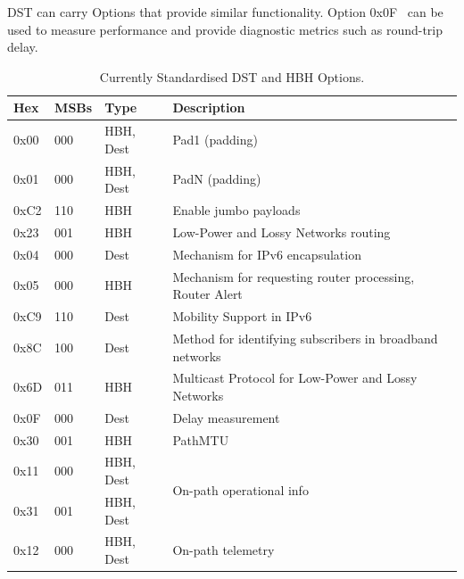 \documentclass[conference]{IEEEtran}
\begin{document}
DST can carry Options that provide similar functionality. Option 0x0F~\cite{rfc8250} can be used to measure performance and provide diagnostic metrics such as round-trip delay. 



\begin{table}[b]
\center
\caption{Currently Standardised DST and HBH Options.}
\begin{tabular}{p{}|p{}|l|p{}}
Hex  & MSBs & Type      & Description                                              \\
\hline
\hline
0x00 & 000  & HBH, Dest & Pad1 (padding)                                           \\
0x01 & 000  & HBH, Dest & PadN (padding)                                           \\
0xC2 & 110  & HBH       & Enable jumbo payloads                                    \\
0x23 & 001  & HBH       & Low-Power and Lossy Networks routing                     \\
0x04 & 000  & Dest      & Mechanism for IPv6 encapsulation                 \\
0x05 & 000  & HBH       & Mechanism for requesting router processing, Router Alert              \\
0xC9 & 110  & Dest      & Mobility Support in IPv6                                 \\
0x8C & 100  & Dest      & Method for identifying subscribers in broadband networks \\
0x6D & 011  & HBH       & Multicast Protocol for Low-Power and  Lossy Networks     \\
0x0F & 000  & Dest      & Delay measurement                                        \\
0x30 & 001  & HBH       & PathMTU                                     \\
0x11 & 000  & HBH, Dest & \multirow{2}{*}{On-path operational info}                \\
0x31 & 001  & HBH, Dest &                                                          \\
0x12 & 000  & HBH, Dest & On-path telemetry                                       
\end{tabular}
  \label{tbl:options}
\end{table}
\end{document}
